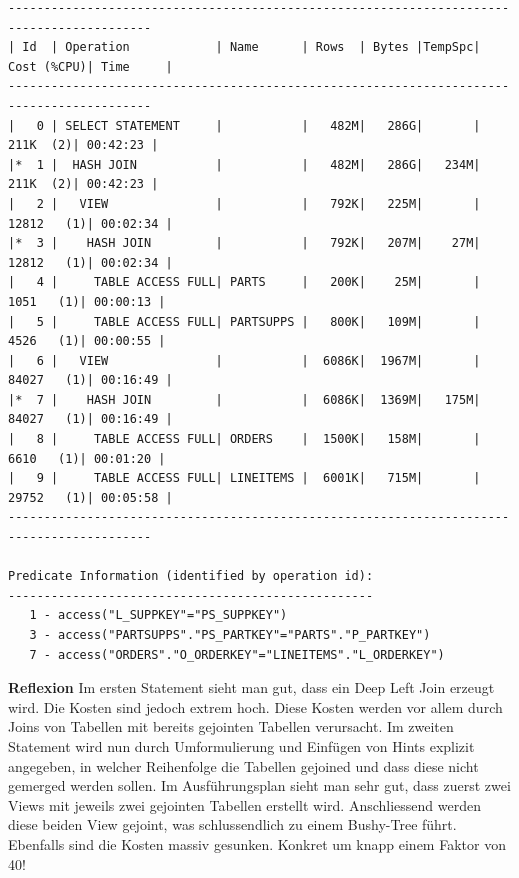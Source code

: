 \documentclass[10pt]{article}
\begin{document}
\begin{lstlisting}[style=queryexecutionplan]
------------------------------------------------------------------------------------------
| Id  | Operation            | Name      | Rows  | Bytes |TempSpc| Cost (%CPU)| Time     |
------------------------------------------------------------------------------------------
|   0 | SELECT STATEMENT     |           |   482M|   286G|       |   211K  (2)| 00:42:23 |
|*  1 |  HASH JOIN           |           |   482M|   286G|   234M|   211K  (2)| 00:42:23 |
|   2 |   VIEW               |           |   792K|   225M|       | 12812   (1)| 00:02:34 |
|*  3 |    HASH JOIN         |           |   792K|   207M|    27M| 12812   (1)| 00:02:34 |
|   4 |     TABLE ACCESS FULL| PARTS     |   200K|    25M|       |  1051   (1)| 00:00:13 |
|   5 |     TABLE ACCESS FULL| PARTSUPPS |   800K|   109M|       |  4526   (1)| 00:00:55 |
|   6 |   VIEW               |           |  6086K|  1967M|       | 84027   (1)| 00:16:49 |
|*  7 |    HASH JOIN         |           |  6086K|  1369M|   175M| 84027   (1)| 00:16:49 |
|   8 |     TABLE ACCESS FULL| ORDERS    |  1500K|   158M|       |  6610   (1)| 00:01:20 |
|   9 |     TABLE ACCESS FULL| LINEITEMS |  6001K|   715M|       | 29752   (1)| 00:05:58 |
------------------------------------------------------------------------------------------

Predicate Information (identified by operation id):
---------------------------------------------------
   1 - access("L_SUPPKEY"="PS_SUPPKEY")
   3 - access("PARTSUPPS"."PS_PARTKEY"="PARTS"."P_PARTKEY")
   7 - access("ORDERS"."O_ORDERKEY"="LINEITEMS"."L_ORDERKEY")
\end{lstlisting}
\textbf{Reflexion} \newline
Im ersten Statement sieht man gut, dass ein Deep Left Join erzeugt wird.
Die Kosten sind jedoch extrem hoch. Diese Kosten werden vor allem durch Joins von Tabellen mit bereits gejointen Tabellen verursacht.\newline
Im zweiten Statement wird nun durch Umformulierung und Einfügen von Hints explizit angegeben, in welcher Reihenfolge die Tabellen gejoined und dass diese nicht gemerged werden sollen. Im Ausführungsplan sieht man sehr gut, dass zuerst zwei Views mit jeweils zwei gejointen Tabellen erstellt wird. Anschliessend werden diese beiden View gejoint, was schlussendlich zu einem Bushy-Tree führt. Ebenfalls sind die Kosten massiv gesunken. Konkret um knapp einem Faktor von 40!\newline
\newline
\end{document}
